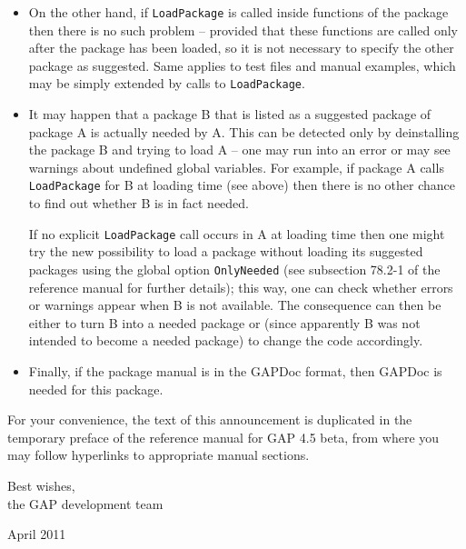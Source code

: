 \documentclass[10pt]{article}
\begin{document}
\begin{itemize}
\begin{itemize}
\item 
On the other hand, if {\tt LoadPackage} is called inside functions of the
package then there is no such problem -- provided that these functions are 
called only after the package has been loaded, so it is not necessary to
specify the other package as suggested. Same applies to test files
and manual examples, which may be simply extended by calls to {\tt LoadPackage}.

\item
It may happen that a package B that is listed as a suggested package
of package A is actually needed by A. This can be detected only
by deinstalling the package B and trying to load A -- one may run into an
error or may see warnings about undefined global variables.
For example, if package A calls {\tt LoadPackage} for B at loading time
(see above) then there is no other chance to find out whether B is in
fact needed.

If no explicit {\tt LoadPackage} call occurs in A at loading time then one
might try the new possibility to load a package without loading its
suggested packages using the global option {\tt OnlyNeeded} 
(see subsection 78.2-1 of the reference manual for further details); 
this way, one can check whether errors or warnings appear when B is not 
available. The consequence can then be either to turn B into a needed package 
or (since apparently B was not intended to become a needed package)
to change the code accordingly.

\item
Finally, if the package manual is in the GAPDoc format, 
then GAPDoc is needed for this package.
\end{itemize}

\end{itemize}

For your convenience, the text of this announcement is duplicated in the
temporary preface of the reference manual for GAP 4.5 beta, from where you 
may follow hyperlinks to appropriate manual sections.

Best wishes,\\
the GAP development team

April 2011
\end{document}
